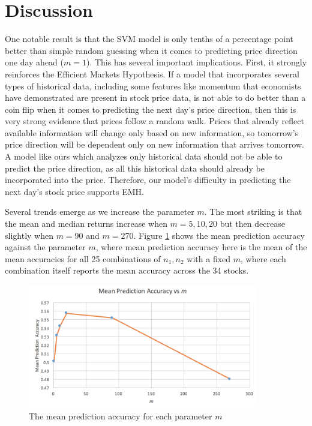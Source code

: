 \documentclass[pageno]{jpaper}
\begin{document}
\section{Discussion}
One notable result is that the SVM model is only tenths of a percentage point better than simple random guessing when it comes to predicting price direction one day ahead ($m=1$). This has several important implications. First, it strongly reinforces the Efficient Markets Hypothesis. If a model that incorporates several types of historical data, including some features like momentum that economists have demonstrated are present in stock price data, is not able to do better than a coin flip when it comes to predicting the next day's price direction, then this is very strong evidence that prices follow a random walk. Prices that already reflect available information will change only based on new information, so tomorrow's price direction will be dependent only on new information that arrives tomorrow. A model like ours which analyzes only historical data should not be able to predict the price direction, as all this historical data should already be incorporated into the price. Therefore, our model's difficulty in predicting the next day's stock price supports EMH.

Several trends emerge as we increase the parameter $m$. The most striking is that the mean and median returns increase when $m=5,10,20$ but then decrease slightly when $m=90$ and $m=270$. Figure \ref{fig: meanvsm} shows the mean prediction accuracy against the parameter $m$, where mean prediction accuracy here is the mean of the mean accuracies for all 25 combinations of $n_1, n_2$ with a fixed $m$, where each combination itself reports the mean accuracy across the 34 stocks.

\begin{figure}
\includegraphics[width=0.9\textwidth]{MeanReturnvsM.png}
\caption{The mean prediction accuracy for each parameter $m$}
\label{fig: meanvsm}
\end{figure}
\end{document}
